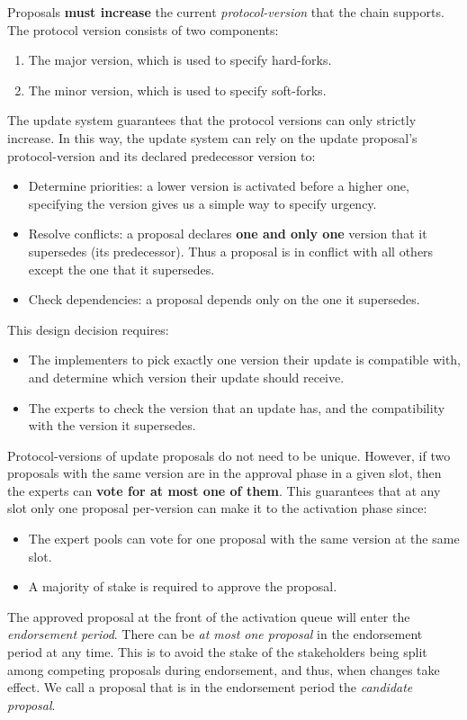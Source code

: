 Proposals \textbf{must increase} the current \emph{protocol-version} that the
chain supports. The protocol version consists of two components:
\begin{enumerate}
\item The major version, which is used to specify hard-forks.
\item The minor version, which is used to specify soft-forks.
\end{enumerate}

The update system guarantees that the protocol versions can only strictly
increase. In this way, the update system can rely on the update proposal's
protocol-version and its declared predecessor version to:
\begin{itemize}
\item Determine priorities: a lower version is activated before a higher one,
  specifying the version gives us a simple way to specify urgency.
\item Resolve conflicts: a proposal declares \textbf{one and only one} version
  that it supersedes (its predecessor). Thus a proposal is in conflict with all
  others except the one that it supersedes.
\item Check dependencies: a proposal depends only on the one it supersedes.
\end{itemize}
This design decision requires:
\begin{itemize}
\item The implementers to pick exactly one version their update is compatible
  with, and determine which version their update should receive.
\item The experts to check the version that an update has, and the compatibility
  with the version it supersedes.
\end{itemize}

Protocol-versions of update proposals do not need to be unique. However, if two
proposals with the same version are in the approval phase in a given slot, then
the experts can \textbf{vote for at most one of them}. This guarantees that at
any slot only one proposal per-version can make it to the activation phase
since:
\begin{itemize}
\item The expert pools can vote for one proposal with the same version at the
  same slot.
\item A majority of stake is required to approve the proposal.
\end{itemize}

The approved proposal at the front of the activation queue will enter the
\emph{endorsement period}.
%
There can be \emph{at most one proposal} in the endorsement period at any time.
%
This is to avoid the stake of the stakeholders being split among competing
proposals during endorsement, and thus, when changes take effect.
%
We call a proposal that is in the endorsement period the \emph{candidate
  proposal}.

